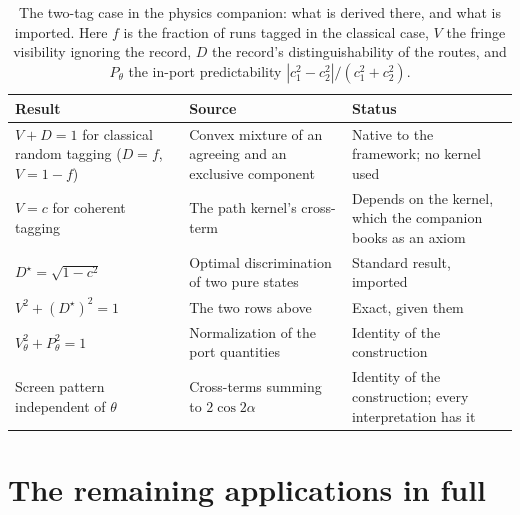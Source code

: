 \begin{table}[htbp]
\centering
\caption{The two-tag case in the physics companion: what is derived there, and what is imported. Here $f$ is the fraction of runs tagged in the classical case, $V$ the fringe visibility ignoring the record, $D$ the record's distinguishability of the routes, and $P_\theta$ the in-port predictability $|c_1^2 - c_2^2|/(c_1^2 + c_2^2)$.}
\label{tab:twotag}
\small
\begin{tabular}{p{} p{} p{}}
\toprule
\textbf{Result} & \textbf{Source} & \textbf{Status} \\
\midrule
$V + D = 1$ for classical random tagging ($D = f$, $V = 1 - f$) & Convex mixture of an agreeing and an exclusive component & Native to the framework; no kernel used \\
$V = c$ for coherent tagging & The path kernel's cross-term & Depends on the kernel, which the companion books as an axiom \\
$D^\star = \sqrt{1 - c^2}$ & Optimal discrimination of two pure states & Standard result, imported \\
$V^2 + (D^\star)^2 = 1$ & The two rows above & Exact, given them \cite{greenberger1988, englert1996} \\
$V_\theta^2 + P_\theta^2 = 1$ & Normalization of the port quantities & Identity of the construction \\
Screen pattern independent of $\theta$ & Cross-terms summing to $2\cos 2\alpha$ & Identity of the construction; every interpretation has it \\
\bottomrule
\end{tabular}
\end{table}


\section{The remaining applications in full}\label{app:applications}

